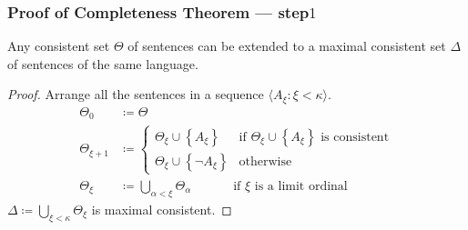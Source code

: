 \documentclass[UTF8,aspectratio=43,11pt,colorlinks,compress,openany]{beamer}%
\begin{document}
\begin{frame}\frametitle{Proof of Completeness Theorem --- step$1$}
	\begin{lemma}
		Any consistent set $\Theta$ of sentences can be extended to a maximal consistent set $\Delta$ of sentences of the same language.
	\end{lemma}
	\begin{proof}
		Arrange all the sentences in a sequence $\langle A_\xi: \xi<\kappa\rangle$.
		\begin{align*}
		\Theta_0&\coloneqq \Theta\\
		\Theta_{\xi+1}&\coloneqq 
		\begin{cases}
		\Theta_\xi\cup\left\{A_\xi\right\}&\text{if $\Theta_\xi\cup\left\{A_\xi\right\}$ is consistent}\\
		\Theta_\xi\cup\left\{\neg A_\xi\right\}&\text{otherwise}
		\end{cases}\\
		\Theta_\xi&\coloneqq \bigcup\limits_{\alpha<\xi}\Theta_\alpha\;\quad\qquad\text{if $\xi$ is a limit ordinal}
		\end{align*}
		$\Delta\coloneqq \bigcup\limits_{\xi<\kappa}\Theta_\xi$ is maximal consistent.
	\end{proof}
\end{frame}
\end{document}
